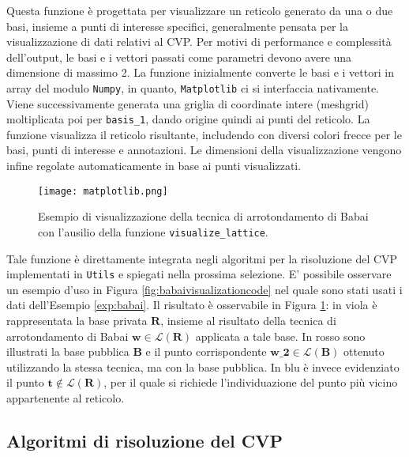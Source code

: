 Questa funzione è progettata per visualizzare un reticolo generato da una o due basi, 
insieme a punti di interesse specifici, generalmente pensata per la visualizzazione di dati
relativi al CVP. Per motivi di performance e complessità dell'output, le basi e i vettori 
passati come parametri devono avere una dimensione di massimo 2. 
La funzione inizialmente converte le basi e i vettori in array del modulo 
\texttt{Numpy}, in quanto, \texttt{Matplotlib} ci si interfaccia nativamente. 
Viene successivamente generata una griglia di coordinate intere (meshgrid) moltiplicata poi 
per \texttt{basis\_1}, dando origine quindi ai punti del reticolo.
La funzione visualizza il reticolo risultante, includendo con diversi colori
frecce per le basi, punti di interesse e annotazioni. Le dimensioni della visualizzazione 
vengono infine regolate automaticamente in base ai punti visualizzati. 

\begin{figure}[H]
    \centering
    \texttt{[image: matplotlib.png]}
    \caption[Esempio di output della funzione \texttt{visualize\_lattice}.]
    {Esempio di visualizzazione della tecnica di arrotondamento di Babai con l'ausilio
    della funzione \texttt{visualize\_lattice}.}
    \label{fig:babaivisualizationout}
\end{figure}

Tale funzione è direttamente integrata negli algoritmi per la risoluzione del CVP
implementati in \texttt{Utils} e spiegati nella prossima selezione. 
E' possibile osservare un esempio d'uso in Figura \ref{fig:babaivisualizationcode} nel
quale sono stati usati i dati dell'Esempio \ref{exp:babai}. Il risultato è osservabile 
in Figura \ref{fig:babaivisualizationout}: in viola è rappresentata la base privata $\mathbf{R}$, 
insieme al risultato della tecnica di arrotondamento di Babai 
$\mathbf{w} \in \mathcal{L}(\mathbf{R})$ applicata a tale base.
In rosso sono illustrati la base pubblica $\mathbf{B}$ e il punto corrispondente 
$\mathbf{w\_2} \in \mathcal{L}(\mathbf{B})$ ottenuto utilizzando 
la stessa tecnica, ma con la base pubblica. In blu è invece 
evidenziato il punto $\mathbf{t} \notin \mathcal{L}(\mathbf{R})$, per il quale si richiede 
l'individuazione del punto più vicino appartenente al reticolo.


\subsection{Algoritmi di risoluzione del CVP}

